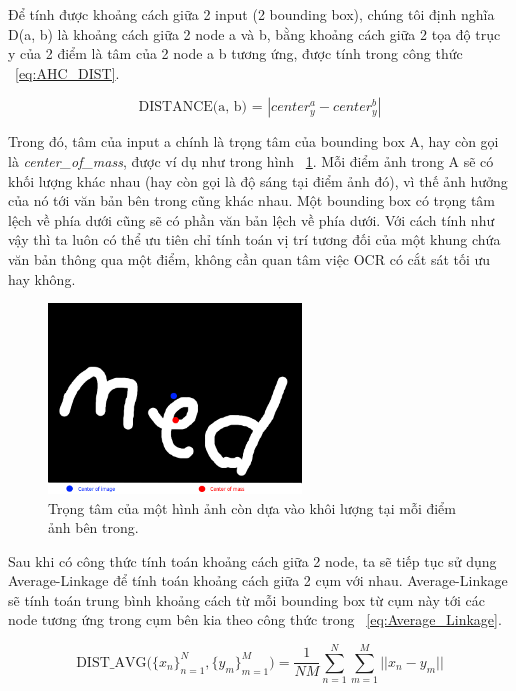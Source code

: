 Để tính được khoảng cách giữa 2 input (2 bounding box), chúng tôi định nghĩa D(a, b) là khoảng cách giữa 2 node a và b, bằng khoảng cách giữa 2 tọa độ trục y của 2 điểm là tâm của 2 node a b tương ứng, được tính trong công thức ~\ref{eq:AHC_DIST}.

\begin{dmath}
    \label{eq:AHC_DIST}
    \text{DISTANCE(a, b) = } | center_y^a - center_y^b |
\end{dmath}

Trong đó, tâm của input a chính là trọng tâm của bounding box A, hay còn gọi là \textit{center_of_mass}, được ví dụ như trong hình ~\ref{center_of_mass}. Mỗi điểm ảnh trong A sẽ có khối lượng khác nhau (hay còn gọi là độ sáng tại điểm ảnh đó), vì thế ảnh hưởng của nó tới văn bản bên trong cũng khác nhau. Một bounding box có trọng tâm lệch về phía dưới cũng sẽ có phần văn bản lệch về phía dưới. Với cách tính như vậy thì ta luôn có thể ưu tiên chỉ tính toán vị trí tương đối của một khung chứa văn bản thông qua một điểm, không cần quan tâm việc OCR có cắt sát tối ưu hay không. 

\begin{figure}
\centering
\includegraphics[width=0.6\textwidth]{mep_img/center_of_mass.png}
\caption{Trọng tâm của một hình ảnh còn dựa vào khôi lượng tại mỗi điểm ảnh bên trong.}\label{center_of_mass}
\end{figure}

Sau khi có công thức tính toán khoảng cách giữa 2 node, ta sẽ tiếp tục sử dụng Average-Linkage để tính toán khoảng cách giữa 2 cụm với nhau. Average-Linkage sẽ tính toán trung bình khoảng cách từ mỗi bounding box từ cụm này tới các node tương ứng trong cụm bên kia theo công thức trong ~\ref{eq:Average_Linkage}.

\begin{dmath}
    \label{eq:Average_Linkage}
    \text{DIST_AVG(} {\{x_n\}}_{n=1}^N, {\{y_m\}}_{m=1}^M \text{)} = \frac{1}{NM}\sum_{n=1}^{N}\sum_{m=1}^{M} ||x_n - y_m ||
\end{dmath}

